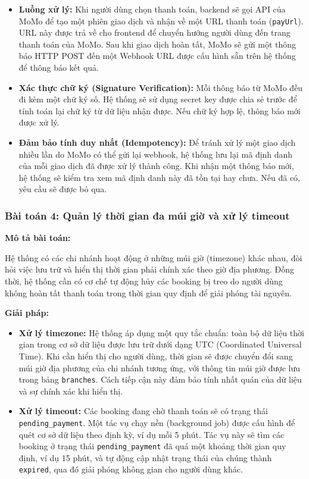 \begin{itemize}
    \item \textbf{Luồng xử lý:} Khi người dùng chọn thanh toán, backend sẽ gọi API của MoMo để tạo một phiên giao dịch và nhận về một URL thanh toán (\texttt{payUrl}). URL này được trả về cho frontend để chuyển hướng người dùng đến trang thanh toán của MoMo. Sau khi giao dịch hoàn tất, MoMo sẽ gửi một thông báo HTTP POST đến một Webhook URL được cấu hình sẵn trên hệ thống để thông báo kết quả.
    \item \textbf{Xác thực chữ ký (Signature Verification):} Mỗi thông báo từ MoMo đều đi kèm một chữ ký số. Hệ thống sẽ sử dụng secret key được chia sẻ trước để tính toán lại chữ ký từ dữ liệu nhận được. Nếu chữ ký hợp lệ, thông báo mới được xử lý.
    \item \textbf{Đảm bảo tính duy nhất (Idempotency):} Để tránh xử lý một giao dịch nhiều lần do MoMo có thể gửi lại webhook, hệ thống lưu lại mã định danh của mỗi giao dịch đã được xử lý thành công. Khi nhận một thông báo mới, hệ thống sẽ kiểm tra xem mã định danh này đã tồn tại hay chưa. Nếu đã có, yêu cầu sẽ được bỏ qua.
\end{itemize}

\subsubsection{Bài toán 4: Quản lý thời gian đa múi giờ và xử lý timeout}

\textbf{Mô tả bài toán:}

Hệ thống có các chi nhánh hoạt động ở những múi giờ (timezone) khác nhau, đòi hỏi việc lưu trữ và hiển thị thời gian phải chính xác theo giờ địa phương. Đồng thời, hệ thống cần có cơ chế tự động hủy các booking bị treo do người dùng không hoàn tất thanh toán trong thời gian quy định để giải phóng tài nguyên.

\textbf{Giải pháp:}

\begin{itemize}
    \item \textbf{Xử lý timezone:} Hệ thống áp dụng một quy tắc chuẩn: toàn bộ dữ liệu thời gian trong cơ sở dữ liệu được lưu trữ dưới dạng UTC (Coordinated Universal Time). Khi cần hiển thị cho người dùng, thời gian sẽ được chuyển đổi sang múi giờ địa phương của chi nhánh tương ứng, với thông tin múi giờ được lưu trong bảng \texttt{branches}. Cách tiếp cận này đảm bảo tính nhất quán của dữ liệu và sự chính xác khi hiển thị.
    \item \textbf{Xử lý timeout:} Các booking đang chờ thanh toán sẽ có trạng thái \texttt{pending\_payment}. Một tác vụ chạy nền (background job) được cấu hình để quét cơ sở dữ liệu theo định kỳ, ví dụ mỗi 5 phút. Tác vụ này sẽ tìm các booking ở trạng thái \texttt{pending\_payment} đã quá một khoảng thời gian quy định, ví dụ 15 phút, và tự động cập nhật trạng thái của chúng thành \texttt{expired}, qua đó giải phóng không gian cho người dùng khác.
\end{itemize}


